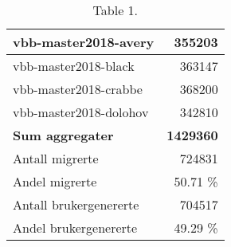\begin{table}[hbtp]
  \begin{center}
    \begin{tabular}{ | l | r |}
      \hline
      vbb-master2018-avery & 355203 \\ \hline
      vbb-master2018-black & 363147 \\ \hline
      vbb-master2018-crabbe & 368200 \\ \hline
      vbb-master2018-dolohov & 342810 \\ \hline
      \textbf{Sum aggregater} & \textbf{1429360} \\ \hline
      Antall migrerte & 724831 \\ \hline
      Andel migrerte & 50.71 \% \\ \hline
      Antall brukergenererte & 704517 \\ \hline
      Andel brukergenererte & 49.29 \% \\ \hline
    \end{tabular}
  \end{center}
  \caption{Table 1.}
  \label{backend3}
\end{table}

